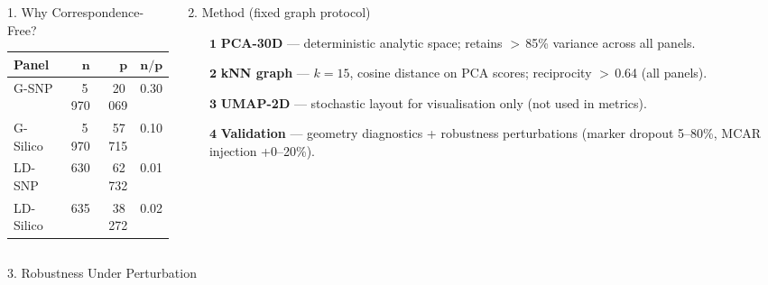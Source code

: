 \documentclass[final]{beamer}
\begin{document}
\begin{frame}[t]
\begin{columns}[T,totalwidth=\textwidth]
\begin{column}{0.495\textwidth}
\begin{block}{1. Why Correspondence-Free?}
\vspace{1mm}
\centering
{\footnotesize
\begin{tabular}{l r r r}
    \toprule
    \textbf{Panel} & \(\boldsymbol{n}\) & \(\boldsymbol{p}\) & \(\boldsymbol{n/p}\) \\
    \midrule
    \textcolor{okblue}{G-SNP}     & 5\,970 & 20\,069 & 0.30 \\
    \textcolor{okteal}{G-Silico}  & 5\,970 & 57\,715 & 0.10 \\
    \textcolor{okverm}{LD-SNP}    &   630  & 62\,732 & 0.01 \\
    \textcolor{okrose}{LD-Silico} &   635  & 38\,272 & 0.02 \\
    \bottomrule
\end{tabular}}
\end{block}
\end{column}

\begin{column}{0.495\textwidth}
\begin{block}{2. Method (fixed graph protocol)}
\justifying
\begin{itemize}\setlength\itemsep{2mm}
    \item[\textcolor{okblue}{\(\boldsymbol{1}\)}]
          \textbf{PCA-30D} — deterministic analytic space;
          retains \(>\)\,85\% variance across all panels.
    \item[\textcolor{okblue}{\(\boldsymbol{2}\)}]
          \textbf{kNN graph} — \(k\!=\!15\), cosine distance
          on PCA scores; reciprocity \(>\)\,0.64 (all panels).
    \item[\textcolor{okblue}{\(\boldsymbol{3}\)}]
          \textbf{UMAP-2D} — stochastic layout for
          visualisation only (not used in metrics).
    \item[\textcolor{okblue}{\(\boldsymbol{4}\)}]
          \textbf{Validation} — geometry diagnostics
          + robustness perturbations (marker dropout
          5–80\%, MCAR injection +0–20\%).
\end{itemize}
\end{block}
\end{column}

\end{columns}

\vspace{5mm}

\begin{block}{3. Robustness Under Perturbation}
\begin{columns}[T,totalwidth=\textwidth]


\end{columns}
\end{block}
\end{frame}
\end{document}
